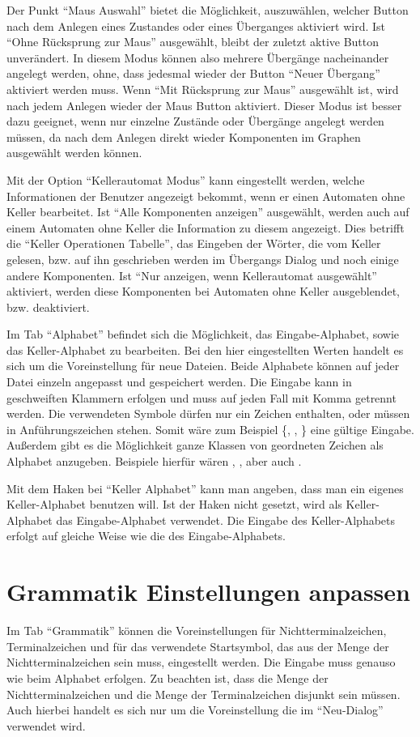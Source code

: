 Der Punkt "`Maus Auswahl"' bietet die Möglichkeit, auszuwählen, welcher Button
nach dem Anlegen eines Zustandes oder eines Überganges aktiviert wird. Ist "`Ohne
Rücksprung zur Maus"' ausgewählt, bleibt der zuletzt aktive Button unverändert.
In diesem Modus können also mehrere Übergänge nacheinander angelegt werden, ohne,
dass jedesmal wieder der Button "`Neuer Übergang"' aktiviert werden muss. Wenn
"`Mit Rücksprung zur Maus"' ausgewählt ist, wird nach jedem Anlegen wieder der
Maus Button aktiviert. Dieser Modus ist besser dazu geeignet, wenn nur einzelne
Zustände oder Übergänge angelegt werden müssen, da nach dem Anlegen direkt wieder
Komponenten im Graphen ausgewählt werden können.\vspace{10pt}

Mit der Option "`Kellerautomat Modus"' kann eingestellt werden, welche Informationen
der Benutzer angezeigt bekommt, wenn er einen Automaten ohne Keller bearbeitet. Ist
"`Alle Komponenten anzeigen"' ausgewählt, werden auch auf einem Automaten ohne Keller
die Information zu diesem angezeigt. Dies betrifft die "`Keller Operationen Tabelle"',
das Eingeben der Wörter, die vom Keller gelesen, bzw. auf ihn geschrieben
werden im Übergangs Dialog und noch einige andere Komponenten. Ist "`Nur anzeigen, wenn
Kellerautomat ausgewählt"' aktiviert, werden diese Komponenten bei Automaten ohne
Keller ausgeblendet, bzw. deaktiviert.\vspace{10pt}

Im Tab "`Alphabet"' befindet sich die Möglichkeit, das Eingabe-Alphabet, sowie
das Keller-Alphabet zu bearbeiten. Bei den hier eingestellten Werten handelt es sich
um die Voreinstellung für neue Dateien. Beide Alphabete können auf jeder Datei
einzeln angepasst und gespeichert werden. Die Eingabe kann in geschweiften
Klammern erfolgen und muss auf jeden Fall mit Komma getrennt werden. Die
verwendeten Symbole dürfen nur ein Zeichen enthalten, oder müssen in
Anführungszeichen stehen. Somit wäre zum Beispiel \{, , 
\} eine gültige Eingabe. Außerdem gibt es die Möglichkeit ganze Klassen von geordneten Zeichen als Alphabet anzugeben. Beispiele hierfür wären \Symbol{[a-z]}, \Symbol{[0-9]}, aber auch \Symbol{[a-Z]}.

Mit dem Haken bei "`Keller Alphabet"' kann
man angeben, dass man ein eigenes Keller-Alphabet benutzen will. Ist der Haken
nicht gesetzt, wird als Keller-Alphabet das Eingabe-Alphabet verwendet. Die
Eingabe des Keller-Alphabets erfolgt auf gleiche Weise wie die des
Eingabe-Alphabets.


\section{Grammatik Einstellungen anpassen}

Im Tab "`Grammatik"' können die Voreinstellungen für Nichtterminalzeichen,
Terminalzeichen und für das verwendete Startsymbol, das aus der Menge der
Nichtterminalzeichen sein muss, eingestellt werden. Die Eingabe muss genauso wie
beim Alphabet erfolgen. Zu beachten ist, dass die Menge der Nichtterminalzeichen
und die Menge der Terminalzeichen disjunkt sein müssen. Auch hierbei handelt es
sich nur um die Voreinstellung die im "`Neu-Dialog"' verwendet wird.
